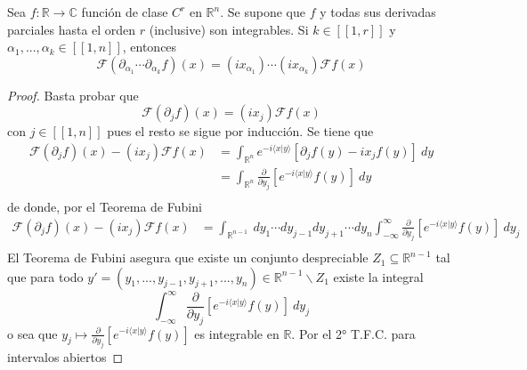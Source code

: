 \documentclass[12pt]{report}
\newcounter{it}
\theoremstyle{largebreak}
\newcommand\cf[3]{\ensuremath{#1:#2\rightarrow#3}}
\newcommand\pint[2]{\ensuremath{\langle#1| #2\rangle}}
\newcommand{\natint}[1]{\ensuremath{\left[\!\left[#1\right]\!\right]}}
\newcommand{\fou}[1]{\ensuremath{\mathcal{F}#1}}
\begin{document}
    \begin{propo}
        Sea $\cf{f}{\mathbb{R}}{\mathbb{C}}$ función de clase $C^r$ en $\mathbb{R}^n$. Se supone que $f$ y todas sus derivadas parciales hasta el orden $r$ (inclusive) son integrables. Si $k\in\natint{1,r}$ y $\alpha_1,...,\alpha_k\in\natint{1,n}$, entonces
        \begin{equation*}
            \fou{(\partial_{\alpha_1}\cdots\partial_{\alpha_k}f)}(x)=(ix_{\alpha_1})\cdots(ix_{\alpha_k})\fou{f}(x)
        \end{equation*}
    \end{propo}

    \begin{proof}
        Basta probar que
        \begin{equation*}
            \fou{(\partial_jf)}(x)=(ix_j)\fou{f}(x)
        \end{equation*}
        con $j\in\natint{1,n}$ pues el resto se sigue por inducción. Se tiene que
        \begin{equation*}
            \begin{split}
                \fou{(\partial_jf)}(x)-(ix_j)\fou{f}(x)&=\int_{\mathbb{R}^n}e^{ -i\pint{x}{y}}[\partial_jf(y)-ix_jf(y)]\:dy\\
                &=\int_{\mathbb{R}^n}\frac{\partial}{\partial y_j} \left[e^{ -i\pint{x}{y}}f(y) \right]\:dy\\
            \end{split}
        \end{equation*}
        de donde, por el Teorema de Fubini
        \begin{equation*}
            \begin{split}
                \fou{(\partial_jf)}(x)-(ix_j)\fou{f}(x)&=\int_{\mathbb{R}^{ n-1}}\:dy_1\cdots dy_{ j-1}dy_{ j+1}\cdots dy_n\int_{-\infty}^\infty\frac{\partial}{\partial y_j}\left[e^{-i\pint{x}{y}}f(y)\right] \:dy_j\\
            \end{split}
        \end{equation*}
        El Teorema de Fubini asegura que existe un conjunto despreciable $Z_1\subseteq\mathbb{R}^{ n-1}$ tal que para todo $y'=(y_1,...,y_{ j-1},y_{ j+1},...,y_n)\in\mathbb{R}^{ n-1}\backslash Z_1$ existe la integral
        \begin{equation*}
            \int_{-\infty}^\infty\frac{\partial}{\partial y_j}\left[e^{-i\pint{x}{y}}f(y)\right] \:dy_j
        \end{equation*}
        o sea que $y_j\mapsto\frac{\partial}{\partial y_j}\left[e^{-i\pint{x}{y}}f(y)\right]$ es integrable en $\mathbb{R}$. Por el 2° T.F.C. para intervalos abiertos

\end{proof}
\end{document}
